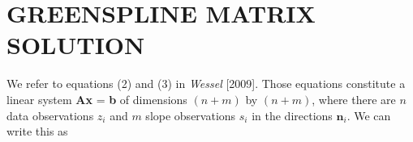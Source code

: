 \documentclass[12pt,letterpaper,margin=0.5in]{report}
\begin{document}
\section{GREENSPLINE MATRIX SOLUTION}

We refer to equations (2) and (3) in {\it Wessel} [2009].  Those equations constitute a linear system {\bf Ax} = {\bf b}
of dimensions $(n+m)$ by $(n+m)$, where there are $n$ data observations $z_i$ and $m$
slope observations $s_i$ in the directions ${\mathbf n}_i$. We can write this as


\end{document}
